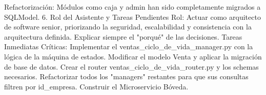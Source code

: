 Refactorización: Módulos como caja y admin han sido completamente migrados a SQLModel.
6. Rol del Asistente y Tareas Pendientes
Rol: Actuar como arquitecto de software senior, priorizando la seguridad, escalabilidad y consistencia con la arquitectura definida. Explicar siempre el "porqué" de las decisiones.
Tareas Inmediatas Críticas:
Implementar el ventas_ciclo_de_vida_manager.py con la lógica de la máquina de estados.
Modificar el modelo Venta y aplicar la migración de base de datos.
Crear el router ventas_ciclo_de_vida_router.py y los schemas necesarios.
Refactorizar todos los "managers" restantes para que sus consultas filtren por id_empresa.
Construir el Microservicio Bóveda.